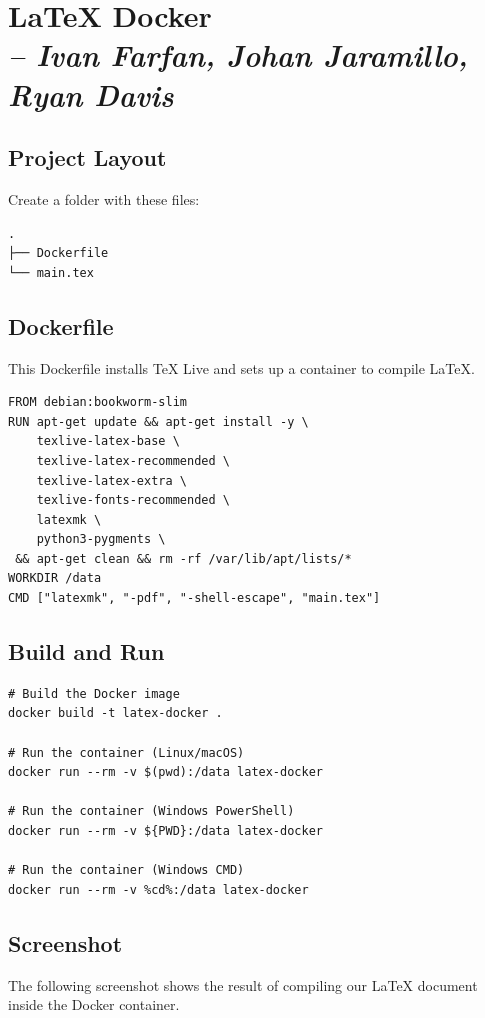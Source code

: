 \chapter{LaTeX Docker \\
\small{\textit{-- Ivan Farfan, Johan Jaramillo, Ryan Davis}}}
\label{Chapter::LaTeXDocker}

\section{Project Layout}
Create a folder with these files:
\begin{verbatim}
.
├── Dockerfile
└── main.tex
\end{verbatim}

\section{Dockerfile}
This Dockerfile installs TeX Live and sets up a container to compile LaTeX.

\begin{verbatim}
FROM debian:bookworm-slim
RUN apt-get update && apt-get install -y \
    texlive-latex-base \
    texlive-latex-recommended \
    texlive-latex-extra \
    texlive-fonts-recommended \
    latexmk \
    python3-pygments \
 && apt-get clean && rm -rf /var/lib/apt/lists/*
WORKDIR /data
CMD ["latexmk", "-pdf", "-shell-escape", "main.tex"]
\end{verbatim}

\section{Build and Run}
\begin{verbatim}
# Build the Docker image
docker build -t latex-docker .

# Run the container (Linux/macOS)
docker run --rm -v $(pwd):/data latex-docker

# Run the container (Windows PowerShell)
docker run --rm -v ${PWD}:/data latex-docker

# Run the container (Windows CMD)
docker run --rm -v %cd%:/data latex-docker
\end{verbatim}
\section{Screenshot}
The following screenshot shows the result of compiling our LaTeX document inside
the Docker container.

